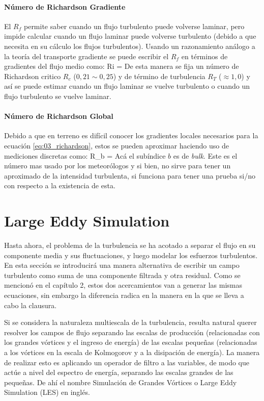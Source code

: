 \paragraph{Número de Richardson Gradiente} El $R_f$ permite saber cuando un flujo turbulento puede volverse laminar, pero impide calcular cuando un flujo laminar puede volverse turbulento (debido a que necesita en su cálculo los flujos turbulentos). Usando un razonamiento análogo a la teoría del transporte gradiente se puede escribir el $R_f$ en términos de gradientes del flujo medio como: 
\be\label{eq:03_richardson} Ri =  \ee
De esta manera se fija un número de Richardson critico $R_c$ ($0,21\sim0,25$) y de término de turbulencia $R_T$ ($\approx1,0$) y así se puede estimar cuando un flujo laminar se vuelve turbulento o cuando un flujo turbulento se vuelve laminar.
\paragraph{Número de Richardson Global} Debido a que en terreno es difícil conocer los gradientes locales necesarios para la ecuación \ref{eq:03_richardson}, estos se pueden aproximar haciendo uso de mediciones discretas como:
\be R_b =  \ee
Acá el subíndice $b$ es de \emph{bulk}. Este es el número mas usado por los meteorólogos y si bien, no sirve para tener un aproximado de la intensidad turbulenta, si funciona para tener una prueba si/no con respecto a la existencia de esta.
\newpage

\section{Large Eddy Simulation}
Hasta ahora, el problema de la turbulencia se ha acotado a separar el flujo en su componente media y sus fluctuaciones, y luego modelar los esfuerzos turbulentos. En esta sección se introducirá una manera alternativa de escribir un campo turbulento como suma de una componente filtrada y otra residual. Como se mencionó en el capítulo 2, estos dos acercamientos van a generar las mismas ecuaciones, sin embargo la diferencia radica en la manera en la que se lleva a cabo la clausura.

Si se considera la naturaleza multiescala de la turbulencia, resulta natural querer resolver los campos de flujo separando las escalas de producción (relacionadas con los grandes vórtices y el ingreso de energía) de las escalas pequeñas (relacionadas a los vórtices en la escala de Kolmogorov y a la disipación de energía). La manera de realizar esto es aplicando un operador de filtro a las variables, de modo que actúe a nivel del espectro de energía, separando las escalas grandes de las pequeñas. De ahí el nombre Simulación de Grandes Vórtices o Large Eddy Simulation (LES) en inglés. 

